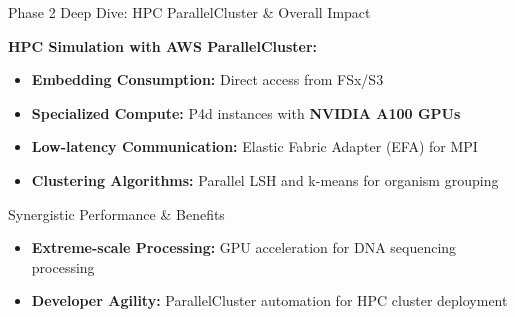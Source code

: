 \documentclass[aspectratio=169]{beamer}
\begin{document}
\begin{frame}{Phase 2 Deep Dive: HPC ParallelCluster \& Overall Impact}

            \textbf{HPC Simulation with AWS ParallelCluster:}
            \begin{itemize}
                \item \textbf{Embedding Consumption:} Direct access from FSx/S3
                \item \textbf{Specialized Compute:} P4d instances with \textcolor{awsorange}{\textbf{NVIDIA A100 GPUs}}
                \item \textbf{Low-latency Communication:} Elastic Fabric Adapter (EFA) for MPI
                \item \textbf{Clustering Algorithms:} Parallel LSH and k-means for organism grouping
            \end{itemize}

    
    \vspace{0.3cm}
    \begin{block}{Synergistic Performance \& Benefits}
        \begin{itemize}
            
            \item \textbf{Extreme-scale Processing:} GPU acceleration for DNA sequencing processing
            \item \textbf{Developer Agility:} ParallelCluster automation for HPC cluster deployment
        \end{itemize}
    \end{block}
\end{frame}
\end{document}
